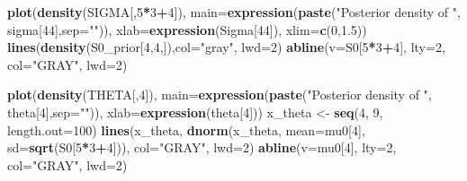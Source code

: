 \documentclass[12pt]{article}
\newenvironment{Shaded}{\begin{snugshade}}{\end{snugshade}}
\newcommand{\AttributeTok}[1]{\textcolor[rgb]{0.13,0.29,0.53}{#1}}
\newcommand{\DecValTok}[1]{\textcolor[rgb]{0.00,0.00,0.81}{#1}}
\newcommand{\FloatTok}[1]{\textcolor[rgb]{0.00,0.00,0.81}{#1}}
\newcommand{\FunctionTok}[1]{\textcolor[rgb]{0.13,0.29,0.53}{\textbf{#1}}}
\newcommand{\NormalTok}[1]{#1}
\newcommand{\OtherTok}[1]{\textcolor[rgb]{0.56,0.35,0.01}{#1}}
\newcommand{\SpecialCharTok}[1]{\textcolor[rgb]{0.81,0.36,0.00}{\textbf{#1}}}
\newcommand{\StringTok}[1]{\textcolor[rgb]{0.31,0.60,0.02}{#1}}
\begin{document}
\begin{Shaded}
\begin{Highlighting}[]
\FunctionTok{plot}\NormalTok{(}\FunctionTok{density}\NormalTok{(SIGMA[,}\DecValTok{5}\SpecialCharTok{*}\DecValTok{3}\SpecialCharTok{+}\DecValTok{4}\NormalTok{]), }
     \AttributeTok{main=}\FunctionTok{expression}\NormalTok{(}\FunctionTok{paste}\NormalTok{(}\StringTok{"Posterior density of "}\NormalTok{, sigma[}\DecValTok{44}\NormalTok{],}\AttributeTok{sep=}\StringTok{""}\NormalTok{)), }
     \AttributeTok{xlab=}\FunctionTok{expression}\NormalTok{(Sigma[}\DecValTok{44}\NormalTok{]), }\AttributeTok{xlim=}\FunctionTok{c}\NormalTok{(}\DecValTok{0}\NormalTok{,}\FloatTok{1.5}\NormalTok{))}
\FunctionTok{lines}\NormalTok{(}\FunctionTok{density}\NormalTok{(S0\_prior[}\DecValTok{4}\NormalTok{,}\DecValTok{4}\NormalTok{,]),}\AttributeTok{col=}\StringTok{"gray"}\NormalTok{, }\AttributeTok{lwd=}\DecValTok{2}\NormalTok{)}
\FunctionTok{abline}\NormalTok{(}\AttributeTok{v=}\NormalTok{S0[}\DecValTok{5}\SpecialCharTok{*}\DecValTok{3}\SpecialCharTok{+}\DecValTok{4}\NormalTok{], }\AttributeTok{lty=}\DecValTok{2}\NormalTok{, }\AttributeTok{col=}\StringTok{"GRAY"}\NormalTok{, }\AttributeTok{lwd=}\DecValTok{2}\NormalTok{)}

\FunctionTok{plot}\NormalTok{(}\FunctionTok{density}\NormalTok{(THETA[,}\DecValTok{4}\NormalTok{]), }
     \AttributeTok{main=}\FunctionTok{expression}\NormalTok{(}\FunctionTok{paste}\NormalTok{(}\StringTok{"Posterior density of "}\NormalTok{, theta[}\DecValTok{4}\NormalTok{],}\AttributeTok{sep=}\StringTok{""}\NormalTok{)), }
     \AttributeTok{xlab=}\FunctionTok{expression}\NormalTok{(theta[}\DecValTok{4}\NormalTok{]))}
\NormalTok{x\_theta }\OtherTok{\textless{}{-}} \FunctionTok{seq}\NormalTok{(}\DecValTok{4}\NormalTok{, }\DecValTok{9}\NormalTok{, }\AttributeTok{length.out=}\DecValTok{100}\NormalTok{)}
\FunctionTok{lines}\NormalTok{(x\_theta, }\FunctionTok{dnorm}\NormalTok{(x\_theta, }\AttributeTok{mean=}\NormalTok{mu0[}\DecValTok{4}\NormalTok{], }\AttributeTok{sd=}\FunctionTok{sqrt}\NormalTok{(S0[}\DecValTok{5}\SpecialCharTok{*}\DecValTok{3}\SpecialCharTok{+}\DecValTok{4}\NormalTok{])), }
      \AttributeTok{col=}\StringTok{"GRAY"}\NormalTok{, }\AttributeTok{lwd=}\DecValTok{2}\NormalTok{)}
\FunctionTok{abline}\NormalTok{(}\AttributeTok{v=}\NormalTok{mu0[}\DecValTok{4}\NormalTok{], }\AttributeTok{lty=}\DecValTok{2}\NormalTok{, }\AttributeTok{col=}\StringTok{"GRAY"}\NormalTok{, }\AttributeTok{lwd=}\DecValTok{2}\NormalTok{)}


\end{Highlighting}
\end{Shaded}
\end{document}
